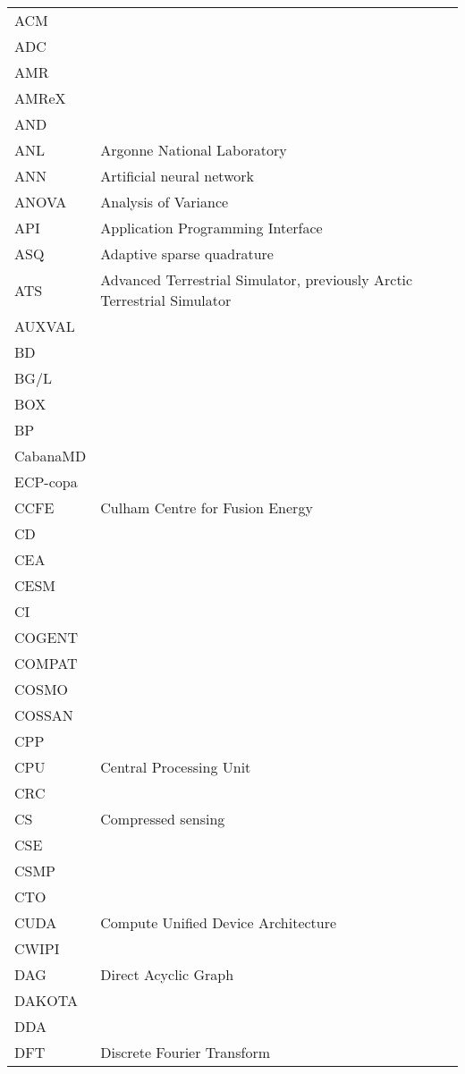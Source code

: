 \begin{longtable}{|p{4.0cm}|p{12.0cm}|}
\hline
ACM & \\
ADC & \\
AMR & \\
AMReX & \\
AND & \\
ANL & Argonne National Laboratory \\
ANN & Artificial neural network \\
ANOVA & Analysis of Variance \\
API & Application Programming Interface \\
ASQ & Adaptive sparse quadrature \\
ATS & Advanced Terrestrial Simulator, previously Arctic Terrestrial Simulator \\
AUXVAL & \\
BD & \\
BG/L & \\
BOX & \\
BP & \\
CabanaMD & \\
ECP-copa & \\
CCFE & Culham Centre for Fusion Energy \\
CD & \\
CEA  & \\
CESM & \\
CI & \\
COGENT & \\
COMPAT & \\
COSMO & \\
COSSAN & \\
CPP & \\
CPU & Central Processing Unit \\
CRC & \\
CS & Compressed sensing \\
CSE & \\
CSMP & \\
CTO & \\
CUDA & Compute Unified Device Architecture \\
CWIPI & \\
DAG & Direct Acyclic Graph \\
DAKOTA & \\
DDA & \\
DFT & Discrete Fourier Transform \\

\end{longtable}
